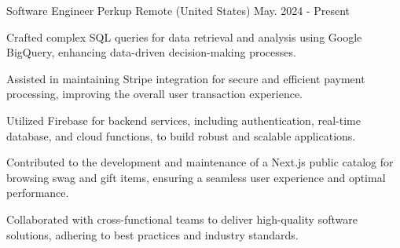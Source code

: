 

\begin{cventries}

\cventry
{Software Engineer} %
{Perkup} %
{Remote (United States)} %
{May. 2024 - Present} %
{
  \begin{cvitems} %
    \item{Crafted complex SQL queries for data retrieval and analysis using Google BigQuery, enhancing data-driven decision-making processes.}
    \item{Assisted in maintaining Stripe integration for secure and efficient payment processing, improving the overall user transaction experience.}
    \item{Utilized Firebase for backend services, including authentication, real-time database, and cloud functions, to build robust and scalable applications.}
    \item{Contributed to the development and maintenance of a Next.js public catalog for browsing swag and gift items, ensuring a seamless user experience and optimal performance.}
    \item{Collaborated with cross-functional teams to deliver high-quality software solutions, adhering to best practices and industry standards.}
  \end{cvitems}
}



\end{cventries}
